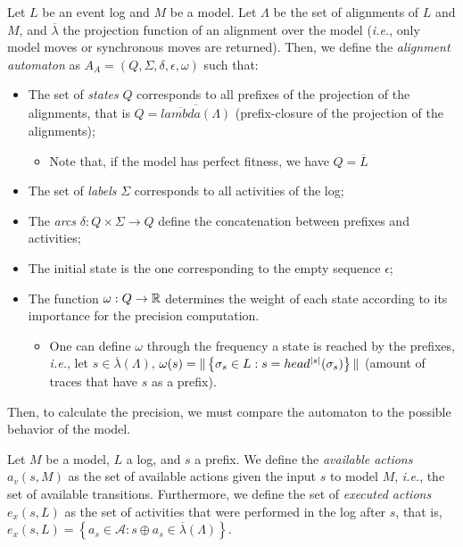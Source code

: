 \documentclass[a4paper]{report}
\begin{document}
\begin{definition}
    Let $L$ be an event log and $M$ be a model. Let $\Lambda$ be the set of alignments of $L$ and $M$, and $\overline{\lambda}$ the projection function of an alignment over the model (\emph{i.e.}, only model moves or synchronous moves are returned). Then, we define the \emph{alignment automaton} as $A_A=\left( Q, \Sigma, \delta, \epsilon, \omega \right) $ such that:
    \begin{itemize}
	\item The set of \emph{states} $Q$ corresponds to all prefixes of the projection of the alignments, that is $Q = \overline{\overline{lambda}\left( \Lambda \right) }$ (prefix-closure of the projection of the alignments);
	    \begin{itemize}
		\item Note that, if the model has perfect fitness, we have $Q=\overline{L}$
	    \end{itemize}
	\item The set of \emph{labels} $\Sigma$ corresponds to all activities of the log;
	\item The \emph{arcs} $\delta : Q\times \Sigma \to Q$ define the concatenation between prefixes and activities;
	\item The initial state is the one corresponding to the empty sequence $\epsilon$;
	\item The function $\omega : Q\to \mathbb{R}$ determines the weight of each state according to its importance for the precision computation.
	    \begin{itemize}
		\item One can define $\omega$ through the frequency a state is reached by the prefixes, \emph{i.e.}, let $s \in \overline{\lambda}\left( \Lambda \right) $, $\omega(s) =  \|\left\{ \sigma_s \in L : s = head^{|s|}(\sigma_s) \\ \right\}\|$ (amount of traces that have $s$ as a prefix).
	    \end{itemize}
    \end{itemize}
\end{definition}

Then, to calculate the precision, we must compare the automaton to the possible behavior of the model.

\begin{definition}
    Let $M$ be a model, $L$ a log, and $s$ a prefix. We define the \emph{available actions} $a_v(s, M)$ as the set of available actions given the input $s$ to model $M$,  \emph{i.e.}, the set of available transitions. Furthermore, we define the set of \emph{executed actions} $e_x(s, L)$ as the set of activities that were performed in the log after $s$, that is, $e_x(s, L) = \left\{ a_s \in \mathcal{A} : s\oplus a_s \in \overline{\lambda}\left( \Lambda \right)  \right\}$.
\end{definition}
\end{document}
